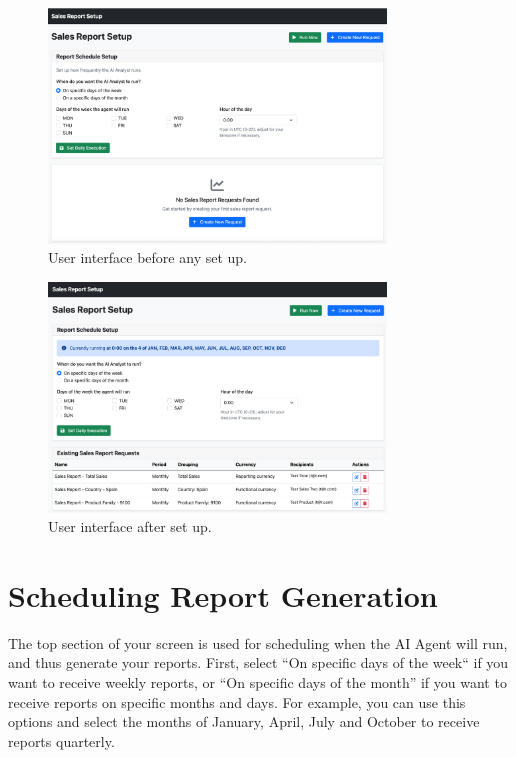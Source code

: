 \documentclass[a4paper]{report}
\begin{document}
\begin{figure}[H]
\centering
\includegraphics[width=0.8\textwidth]{images/frontend-empty.png}
\caption{User interface before any set up.}
\label{fig:frontend-empty}
\end{figure}

\begin{figure}[h]
\centering
\includegraphics[width=0.8\textwidth]{images/frontend-filled.png}
\caption{User interface after set up.}
\label{fig:frontend-filled}
\end{figure}

\section{Scheduling Report Generation}

The top section of your screen is used for scheduling when the AI Agent will run, and thus generate your reports. First, select ``On specific days of the week`` if you want to receive weekly reports, or ``On specific days of the month'' if you want to receive reports on specific months and days. For example, you can use this options and select the months of January, April, July and October to receive reports quarterly.
\end{document}
